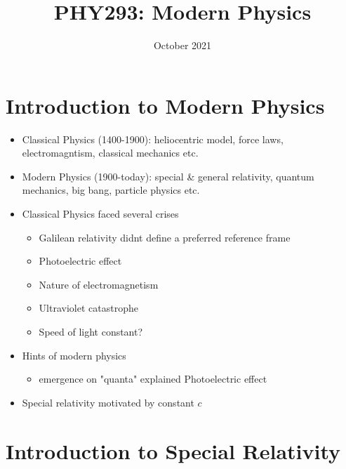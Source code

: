 \documentclass[12pt]{article}
\title{PHY293: Modern Physics}
\date{October 2021}
\begin{document}
\maketitle
\tableofcontents

\section{Introduction to Modern Physics}

\begin{itemize}
    \item Classical Physics (1400-1900): heliocentric model, force laws, electromagntism, classical mechanics etc. 
    \item Modern Physics (1900-today): special \& general relativity, quantum mechanics, big bang, particle physics etc.
    \item Classical Physics faced several crises \begin{itemize}
        \item Galilean relativity didnt define a preferred reference frame
        \item Photoelectric effect 
        \item Nature of electromagnetism
        \item Ultraviolet catastrophe
        \item Speed of light constant?
    \end{itemize}
    \item Hints of modern physics \begin{itemize}
        \item emergence on "quanta" explained Photoelectric effect
    \end{itemize}
    \item Special relativity motivated by constant $c$ 
\end{itemize}

\section{Introduction to Special Relativity}
\end{document}
